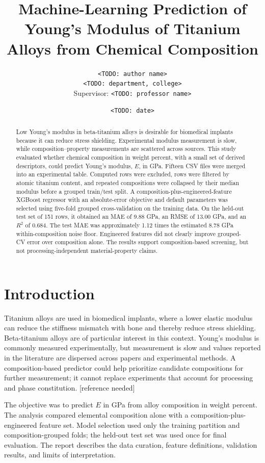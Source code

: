 \documentclass[11pt,oneside]{article}
\title{\textbf{Machine-Learning Prediction of Young's Modulus of Titanium Alloys from Chemical Composition}}
\author{\texttt{<TODO: author name>}\\
\texttt{<TODO: department, college>}\\[0.5em]
Supervisor: \texttt{<TODO: professor name>}}
\date{\texttt{<TODO: date>}}
\begin{document}
\maketitle

\begin{abstract}
Low Young's modulus in beta-titanium alloys is desirable for biomedical implants because it can reduce stress shielding. Experimental modulus measurement is slow, while composition--property measurements are scattered across sources. This study evaluated whether chemical composition in weight percent, with a small set of derived descriptors, could predict Young's modulus, \(E\), in GPa. Fifteen CSV files were merged into an experimental table. Computed rows were excluded, rows were filtered by atomic titanium content, and repeated compositions were collapsed by their median modulus before a grouped train/test split. A composition-plus-engineered-feature XGBoost regressor with an absolute-error objective and default parameters was selected using five-fold grouped cross-validation on the training data. On the held-out test set of 151 rows, it obtained an MAE of 9.88 GPa, an RMSE of 13.00 GPa, and an \(R^2\) of 0.684. The test MAE was approximately 1.12 times the estimated 8.78 GPa within-composition noise floor. Engineered features did not clearly improve grouped-CV error over composition alone. The results support composition-based screening, but not processing-independent material-property claims.
\end{abstract}

\section{Introduction}
Titanium alloys are used in biomedical implants, where a lower elastic modulus can reduce the stiffness mismatch with bone and thereby reduce stress shielding. Beta-titanium alloys are of particular interest in this context. Young's modulus is commonly measured experimentally, but measurement is slow and values reported in the literature are dispersed across papers and experimental methods. A composition-based predictor could help prioritize candidate compositions for further measurement; it cannot replace experiments that account for processing and phase constitution. [reference needed]

The objective was to predict \(E\) in GPa from alloy composition in weight percent. The analysis compared elemental composition alone with a composition-plus-engineered feature set. Model selection used only the training partition and composition-grouped folds; the held-out test set was used once for final evaluation. The report describes the data curation, feature definitions, validation results, and limits of interpretation.
\end{document}

